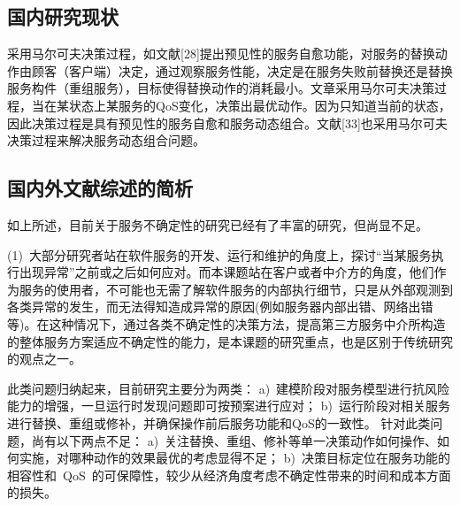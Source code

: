 %


\subsection{国内研究现状}
采用马尔可夫决策过程，如文献[28]提出预见性的服务自愈功能，对服务的替换动作由顾客（客户端）决定，通过观察服务性能，决定是在服务失败前替换还是替换服务构件（重组服务），目标使得替换动作的消耗最小。文章采用马尔可夫决策过程，当在某状态上某服务的QoS变化，决策出最优动作。因为只知道当前的状态，因此决策过程是具有预见性的服务自愈和服务动态组合。文献[33]也采用马尔可夫决策过程来解决服务动态组合问题。


\subsection{国内外文献综述的简析}
如上所述，目前关于服务不确定性的研究已经有了丰富的研究，但尚显不足。

(1)~大部分研究者站在软件服务的开发、运行和维护的角度上，探讨“当某服务执行出现异常”之前或之后如何应对。而本课题站在客户或者中介方的角度，他们作为服务的使用者，不可能也无需了解软件服务的内部执行细节，只是从外部观测到各类异常的发生，而无法得知造成异常的原因(例如服务器内部出错、网络出错等)。在这种情况下，通过各类不确定性的决策方法，提高第三方服务中介所构造的整体服务方案适应不确定性的能力，是本课题的研究重点，也是区别于传统研究的观点之一。

此类问题归纳起来，目前研究主要分为两类：
a)~建模阶段对服务模型进行抗风险能力的增强，一旦运行时发现问题即可按预案进行应对；
b)~运行阶段对相关服务进行替换、重组或修补，并确保操作前后服务功能和QoS的一致性。
针对此类问题，尚有以下两点不足：
a)~关注替换、重组、修补等单一决策动作如何操作、如何实施，对哪种动作的效果最优的考虑显得不足；
b)~决策目标定位在服务功能的相容性和~QoS~的可保障性，较少从经济角度考虑不确定性带来的时间和成本方面的损失。

